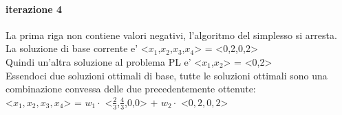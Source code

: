 \documentclass[a4paper,12pt,oneside]{article}
\begin{document}
    \paragraph{iterazione 4}

    La prima riga non contiene valori negativi, l'algoritmo del simplesso si arresta. \\
    La soluzione di base corrente e' <$x_1$,$x_2$,$x_3$,$x_4$> = <0,2,0,2> \\
    Quindi un'altra soluzione al problema PL e' <$x_1$,$x_2$> = <0,2>\\

    Essendoci due soluzioni ottimali di base, tutte le soluzioni ottimali sono una combinazione convessa delle due precedentemente ottenute: \\
    <$x_1, x_2, x_3, x_4$> = $w_1 \cdot $ <$\frac 2 3$,$\frac 4 3$,0,0> $+$ $w_2 \cdot $ <$0,2,0,2$>
\end{document}
